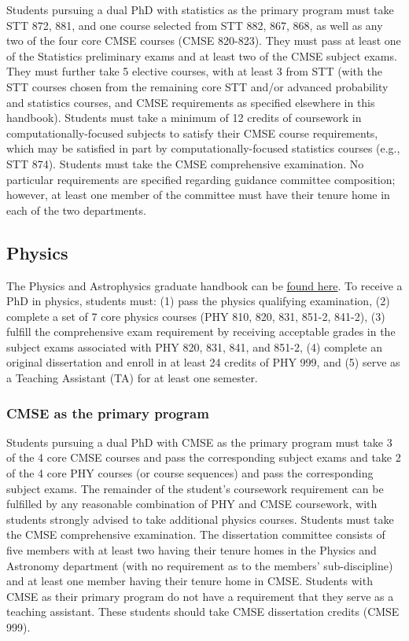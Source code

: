 Students pursuing a dual PhD with statistics as the primary program
must take STT 872, 881, and one course selected from STT 882, 867,
868, as well as any two of the four core CMSE courses (CMSE 820-823).
They must pass at least one of the Statistics preliminary exams and at
least two of the CMSE subject exams.  They must further take 5
elective courses, with at least 3 from STT (with the STT courses
chosen from the remaining core STT and/or advanced probability and
statistics courses, and CMSE requirements as specified elsewhere in
this handbook).  Students must take a minimum of 12 credits of
coursework in computationally-focused subjects to satisfy their CMSE
course requirements, which may be satisfied in part by computationally-focused
statistics courses (e.g., STT 874).  Students must take the CMSE comprehensive
examination.  No particular requirements are specified regarding
guidance committee composition; however, at least one member of the
committee must have their tenure home in each of the two departments.


\subsection{Physics}

The Physics and Astrophysics graduate handbook can be \href{http://www.pa.msu.edu/grad/GradHandbook.pdf}{found
  here}.  
To receive a PhD in physics, students must: (1) pass the physics
qualifying examination, (2) complete a set of 7 core physics courses
(PHY 810, 820, 831, 851-2, 841-2), (3) fulfill the comprehensive exam
requirement by receiving acceptable grades in the subject exams
associated with PHY 820, 831, 841, and 851-2, (4) complete an original
dissertation and enroll in at least 24 credits of PHY 999, and (5)
serve as a Teaching Assistant (TA) for at least one semester.

\subsubsection{CMSE as the primary program}

Students pursuing a dual PhD with CMSE as the primary program must
take 3 of the 4 core CMSE courses and pass the corresponding subject
exams and take 2 of the 4 core PHY courses (or course sequences) and
pass the corresponding subject exams.  The remainder of the student's
coursework requirement can be fulfilled by any reasonable combination
of PHY and CMSE coursework, with students strongly advised to take
additional physics courses.  Students must take the CMSE comprehensive
examination.  The dissertation committee consists of five members with
at least two having their tenure homes in the Physics and Astronomy
department (with no requirement as to the members' sub-discipline) and
at least one member having their tenure home in CMSE.  Students with
CMSE as their primary program do not have a requirement that they
serve as a teaching assistant.  These students should take CMSE
dissertation credits (CMSE 999).

